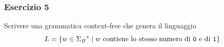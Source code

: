 \begin{frame}
	\frametitle{Esercizio 5}
	Scrivere una grammatica context-free che genera il linguaggio
	\[
		L = \{ w \in \Sigma_{B}\kleene \; \vert \; w \text{ contiene lo stesso numero di \zero e di \uno} \}
	\]
\end{frame}



